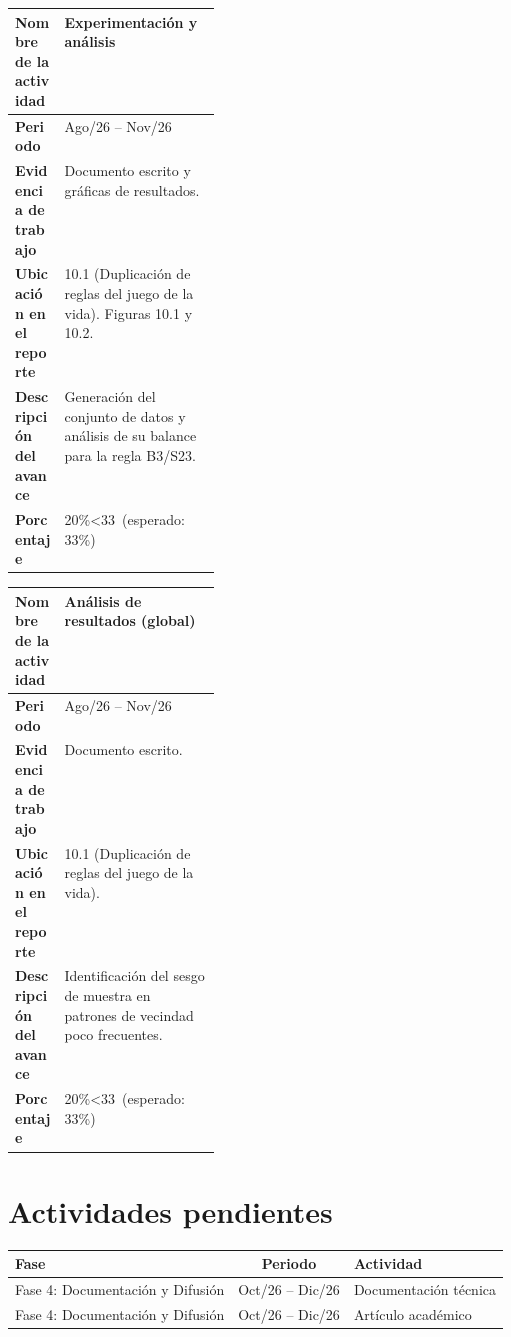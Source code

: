 \documentclass[letterpaper,10pt,oneside]{article}
\def\espExperimentos{33}    \def\realExperimentos{20}
\def\espAnalisis{33}        \def\realAnalisis{20}
\newcommand\porcentaje[2]{#2\%\ifnum#2<#1\ (esperado: #1\%)\fi}
\begin{document}
	\begin{table}[H]
		\centering
		\renewcommand{\arraystretch}{1.25}
		\begin{tabularx}{\linewidth}{|>{\raggedright\bfseries\arraybackslash}p{0.24\linewidth}|X|}
			\hline
			\rowcolor{encabezado}
			Nombre de la actividad & \textbf{Experimentación y análisis} \\ \hline
			Periodo & Ago/26 -- Nov/26 \\ \hline
			Evidencia de trabajo & Documento escrito y gráficas de resultados. \\ \hline
			Ubicación en el reporte & 10.1 (Duplicación de reglas del juego de la vida). Figuras 10.1 y 10.2. \\ \hline
			Descripción del avance & Generación del conjunto de datos y análisis de su balance para la regla B3/S23. \\ \hline
			Porcentaje & \porcentaje{\espExperimentos}{\realExperimentos} \\ \hline
		\end{tabularx}
	\end{table}

	\begin{table}[H]
		\centering
		\renewcommand{\arraystretch}{1.25}
		\begin{tabularx}{\linewidth}{|>{\raggedright\bfseries\arraybackslash}p{0.24\linewidth}|X|}
			\hline
			\rowcolor{encabezado}
			Nombre de la actividad & \textbf{Análisis de resultados (global)} \\ \hline
			Periodo & Ago/26 -- Nov/26 \\ \hline
			Evidencia de trabajo & Documento escrito. \\ \hline
			Ubicación en el reporte & 10.1 (Duplicación de reglas del juego de la vida). \\ \hline
			Descripción del avance & Identificación del sesgo de muestra en patrones de vecindad poco frecuentes. \\ \hline
			Porcentaje & \porcentaje{\espAnalisis}{\realAnalisis} \\ \hline
		\end{tabularx}
	\end{table}

	\section{Actividades pendientes}

	\begin{table}[H]
		\centering
		\renewcommand{\arraystretch}{1.2}
		\begin{tabular}{l c l}
			\toprule
			\textbf{Fase} & \textbf{Periodo} & \textbf{Actividad} \\
			\midrule
			Fase 4: Documentación y Difusión & Oct/26 -- Dic/26 & Documentación técnica \\
			Fase 4: Documentación y Difusión & Oct/26 -- Dic/26 & Artículo académico \\
			\bottomrule
		\end{tabular}
	\end{table}
\end{document}
